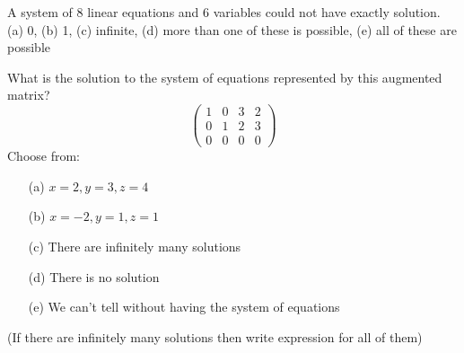 \begin{problem}
    A system of 8 linear equations and 6 variables could not have exactly
    \underline{\hspace{0.5in}} solution.  \\ (a) 0, \quad (b) 1, \quad (c) infinite, \quad
    (d) more than one of these is possible, \quad (e) all of these are possible
\end{problem}
%             
% 
% 
%             
% 
% 
\begin{problem}
    What is the solution to the system of equations represented by this augmented matrix?
    \[ \left( \begin{array}{ccc|c} 1 & 0 & 3 & 2 \\ 0 & 1 & 2 & 3 \\ 0 & 0 & 0 & 0
        \end{array} \right) \]
    Choose from:
    \begin{enumerate}
        \item[(a)] $x=2, y=3, z=4$
        \item[(b)] $x=-2, y=1, z=1$
        \item[(c)] There are infinitely many solutions
        \item[(d)] There is no solution
        \item[(e)] We can't tell without having the system of equations
    \end{enumerate}
    (If there are infinitely many solutions then write expression for all of them)
\end{problem}

